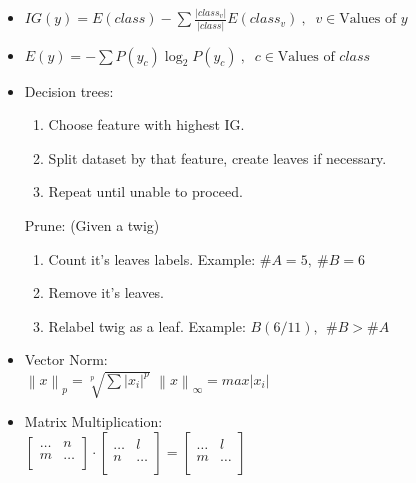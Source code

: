 \documentclass[twocolumn, 10pt]{article}
\begin{document}
\begin{itemize}[leftmargin=*, itemsep=0pt]
    \item $\displaystyle IG(y)=E(class)-\sum\frac{|class_v|}{|class|}E(class_v)\ , \;\;
           v \in \mbox{Values of } y$

    \item $\displaystyle E(y)=-\sum P(y_c)\log_2 P(y_c)\ , \;\; 
           c \in \mbox{Values of } class$

    \item Decision trees:
    \begin{enumerate}[topsep=0pt, itemsep=0pt]
        \item Choose feature with highest IG.
        \item Split dataset by that feature, create leaves if necessary.
        \item Repeat until unable to proceed.
    \end{enumerate}
    Prune: (Given a twig)
    \begin{enumerate}[topsep=0pt, itemsep=0pt]
        \item Count it's leaves labels. \; Example: $\#A=5, \ \#B=6$
        \item Remove it's leaves.
        \item Relabel twig as a leaf. \; Example: $B(6/11), \ \ \#B>\#A$ 
    \end{enumerate}

    \item Vector Norm: \\[2pt]
    $\displaystyle\left\lVert x\right\rVert _p=\sqrt[p]{\sum\left\lvert x_i\right\rvert ^p}$ \;\;\;\;\; $\displaystyle\left\lVert x\right\rVert _\infty=max \left\lvert x_i\right\rvert$

    \newpage
    \item Matrix Multiplication: \\[3pt]
    $\begin{bmatrix}
        \ldots & n \\
        m & \ldots \\
    \end{bmatrix} \cdot
    \begin{bmatrix}
        \ldots & l \\
        n & \ldots \\
    \end{bmatrix} =
    \begin{bmatrix}
        \ldots  & l \\
        m  & \ldots \\
    \end{bmatrix}$


\end{itemize}
\end{document}
